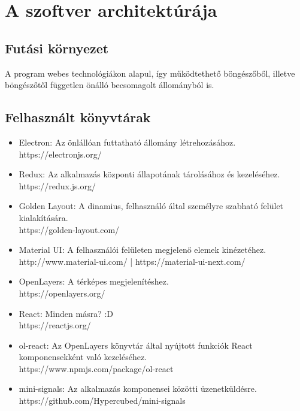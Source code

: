 \section{A szoftver architektúrája}

\subsection{Futási környezet}

A program webes technológiákon alapul, így működtethető böngészőből, illetve
böngészőtől független önálló becsomagolt állományból is.

\subsection{Felhasznált könyvtárak}

\begin{itemize}
  \item Electron: Az önlállóan futtatható állomány létrehozásához. \\
  https://electronjs.org/

  \item Redux: Az alkalmazás központi állapotának tárolásához és kezeléséhez. \\
  https://redux.js.org/

  \item Golden Layout: A dinamius, felhasználó által személyre szabható felület
  kialakítására. \\
  https://golden-layout.com/

  \item Material UI: A felhasználói felületen megjelenő elemek kinézetéhez. \\
  http://www.material-ui.com/ |  https://material-ui-next.com/

  \item OpenLayers: A térképes megjelenítéshez. \\
  https://openlayers.org/

  \item React: Minden másra? :D \\
  https://reactjs.org/

  \item ol-react: Az OpenLayers könyvtár által nyújtott funkciók React
  komponensekként való kezeléséhez. \\
  https://www.npmjs.com/package/ol-react

  \item mini-signals: Az alkalmazás komponensei közötti üzenetküldésre. \\
  https://github.com/Hypercubed/mini-signals
\end{itemize}

